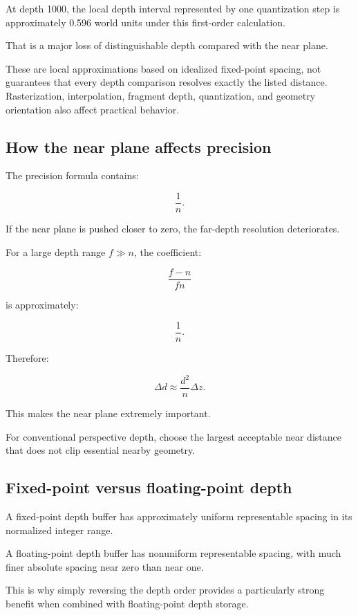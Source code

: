 At depth 1000, the local depth interval represented by one quantization step is approximately 0.596 world units under this first-order calculation.

That is a major loss of distinguishable depth compared with the near plane.

These are local approximations based on idealized fixed-point spacing, not guarantees that every depth comparison resolves exactly the listed distance. Rasterization, interpolation, fragment depth, quantization, and geometry orientation also affect practical behavior.

\subsection{How the near plane affects precision}\label{02-foundations-ii-ch033-how-the-near-plane-affects-precision}

The precision formula contains:

\[
 \frac1n.
\]

If the near plane is pushed closer to zero, the far-depth resolution deteriorates.

For a large depth range \(f\gg n\), the coefficient:

\[
 \frac{f-n}{fn}
\]

is approximately:

\[
 \frac1n.
\]

Therefore:

\[
 \boxed{ \Delta d\approx\frac{d^2}{n}\Delta z }.
\]

This makes the near plane extremely important.

For conventional perspective depth, choose the largest acceptable near distance that does not clip essential nearby geometry.

\subsection{Fixed-point versus floating-point depth}\label{02-foundations-ii-ch033-fixed-point-versus-floating-point-depth}

A fixed-point depth buffer has approximately uniform representable spacing in its normalized integer range.

A floating-point depth buffer has nonuniform representable spacing, with much finer absolute spacing near zero than near one.

This is why simply reversing the depth order provides a particularly strong benefit when combined with floating-point depth storage.


